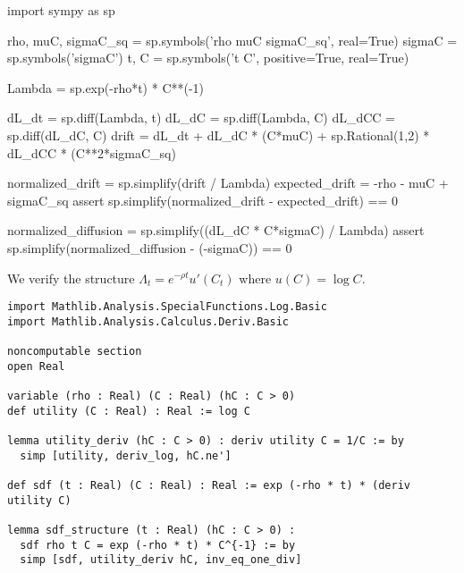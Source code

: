 ﻿\documentclass[11pt,letterpaper,oneside]{article}
\numberwithin{equation}{section}
\newcommand{\1}{\mathbf{1}}
\begin{document}
\begin{sympycheck}[title={Verification: SDF dynamics via It\^o's Lemma}]
\begin{pyconsole}
import sympy as sp

rho, muC, sigmaC_sq = sp.symbols('rho muC sigmaC_sq', real=True)
sigmaC = sp.symbols('sigmaC')
t, C = sp.symbols('t C', positive=True, real=True)

Lambda = sp.exp(-rho*t) * C**(-1)

dL_dt = sp.diff(Lambda, t)
dL_dC = sp.diff(Lambda, C)
dL_dCC = sp.diff(dL_dC, C)
drift = dL_dt + dL_dC * (C*muC) + sp.Rational(1,2) * dL_dCC * (C**2*sigmaC_sq)

normalized_drift = sp.simplify(drift / Lambda)
expected_drift = -rho - muC + sigmaC_sq
assert sp.simplify(normalized_drift - expected_drift) == 0

normalized_diffusion = sp.simplify((dL_dC * C*sigmaC) / Lambda)
assert sp.simplify(normalized_diffusion - (-sigmaC)) == 0
\end{pyconsole}
\end{sympycheck}

\begin{leanproof}[title={Structural Definition: Log-Utility SDF}]
We verify the structure $\Lambda_t = e^{-\rho t} u'(C_t)$ where $u(C) = \log C$.
\begin{lstlisting}[language={},basicstyle=\ttfamily\small]
import Mathlib.Analysis.SpecialFunctions.Log.Basic
import Mathlib.Analysis.Calculus.Deriv.Basic

noncomputable section
open Real

variable (rho : Real) (C : Real) (hC : C > 0)
def utility (C : Real) : Real := log C

lemma utility_deriv (hC : C > 0) : deriv utility C = 1/C := by
  simp [utility, deriv_log, hC.ne']

def sdf (t : Real) (C : Real) : Real := exp (-rho * t) * (deriv utility C)

lemma sdf_structure (t : Real) (hC : C > 0) :
  sdf rho t C = exp (-rho * t) * C^{-1} := by
  simp [sdf, utility_deriv hC, inv_eq_one_div]
\end{lstlisting}
\end{leanproof}
\end{document}
